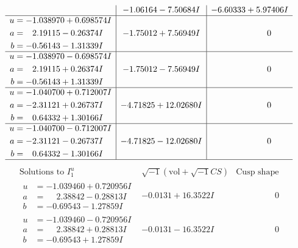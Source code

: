 \documentclass[1p]{elsarticle_modified}
\theoremstyle{definition}
\newcommand{\I}{\sqrt{-1}}
\begin{document}
$$\begin{array}{c|c|c}
 & -1.06164 - 7.50684 I & -6.60333 + 5.97406 I \\ \hline\begin{aligned}
u &= -1.038970 + 0.698574 I \\
a &= \phantom{-}2.19115 - 0.26374 I \\
b &= -0.56143 - 1.31339 I\end{aligned}
 & -1.75012 + 7.56949 I & \phantom{-0.000000 } 0 \\ \hline\begin{aligned}
u &= -1.038970 - 0.698574 I \\
a &= \phantom{-}2.19115 + 0.26374 I \\
b &= -0.56143 + 1.31339 I\end{aligned}
 & -1.75012 - 7.56949 I & \phantom{-0.000000 } 0 \\ \hline\begin{aligned}
u &= -1.040700 + 0.712007 I \\
a &= -2.31121 + 0.26737 I \\
b &= \phantom{-}0.64332 + 1.30166 I\end{aligned}
 & -4.71825 + 12.02680 I & \phantom{-0.000000 } 0 \\ \hline\begin{aligned}
u &= -1.040700 - 0.712007 I \\
a &= -2.31121 - 0.26737 I \\
b &= \phantom{-}0.64332 - 1.30166 I\end{aligned}
 & -4.71825 - 12.02680 I & \phantom{-0.000000 } 0\\
 \hline 
 \end{array}$$\newpage$$\begin{array}{c|c|c}  
\text{Solutions to }I^u_{1}& \I (\text{vol} + \sqrt{-1}CS) & \text{Cusp shape}\\
 \hline 
\begin{aligned}
u &= -1.039460 + 0.720956 I \\
a &= \phantom{-}2.38842 - 0.28813 I \\
b &= -0.69543 - 1.27859 I\end{aligned}
 & -0.0131 + 16.3522 I & \phantom{-0.000000 } 0 \\ \hline\begin{aligned}
u &= -1.039460 - 0.720956 I \\
a &= \phantom{-}2.38842 + 0.28813 I \\
b &= -0.69543 + 1.27859 I\end{aligned}
 & -0.0131 - 16.3522 I & \phantom{-0.000000 } 0 \\ \hline\begin{aligned}

\end{aligned}
\end{array}$$
\end{document}
